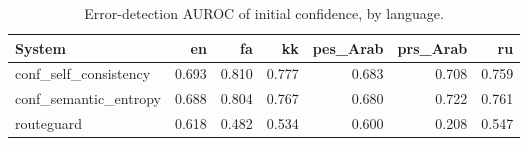 \begin{table}[t]
\centering
\small
\caption{Error-detection AUROC of initial confidence, by language.}
\label{tab:language_reliability}
\begin{tabular}{lrrrrrr}
\toprule
System & en & fa & kk & pes\_Arab & prs\_Arab & ru \\
\midrule
conf\_self\_consistency & 0.693 & 0.810 & 0.777 & 0.683 & 0.708 & 0.759 \\
conf\_semantic\_entropy & 0.688 & 0.804 & 0.767 & 0.680 & 0.722 & 0.761 \\
routeguard & 0.618 & 0.482 & 0.534 & 0.600 & 0.208 & 0.547 \\
\bottomrule
\end{tabular}
\end{table}
